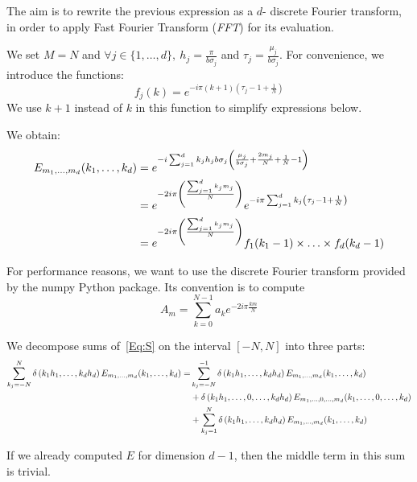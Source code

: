 The aim is to rewrite the previous expression as a $d$- discrete Fourier transform, in order to apply Fast Fourier Transform (\emph{FFT}) for its evaluation.

We set $M=N$ and $\forall j \in\{1,\hdots,d\},\: h_j=\frac{\pi}{b\sigma_j}$ and $\tau_j=\frac{\mu_j}{b\sigma_j}$.
For convenience, we introduce the functions:
$$
f_j(k) = e^{-i\pi (k+1)\left(\tau_j-1+\frac{1}{N}\right)}
$$
We use $k+1$ instead of $k$ in this function to simplify expressions below.

We obtain:
\begin{align}
E_{m_1,\hdots,m_d}(k_1,\hdots,k_d)&=e^{-i\sum_{j=1}^{d} k_jh_jb\sigma_j\left(\frac{\mu_j}{b\sigma_j}+\frac{2m_j}{N}+\frac{1}{N}-1\right)}\notag\\
   &=e^{-2i\pi\left(\frac{\sum_{j=1}^{d}k_j m_j}{N}\right)}e^{-i\pi\sum_{j=1}^{d} k_j\left(\tau_j-1+\frac{1}{N}\right)} \notag\\
   &=e^{-2i\pi\left(\frac{\sum_{j=1}^{d}k_j m_j}{N}\right)} f_1(k_1-1) \times\hdots\times f_d(k_d-1) \label{Eq:E}
\end{align}

For performance reasons, we want to use the discrete Fourier transform provided by the numpy Python package.  Its convention is to compute
$$
A_m = \sum_{k=0}^{N-1} a_k e^{-2i\pi\frac{km}{N}}
$$

We decompose sums of~\eqref{Eq:S} on the interval $[-N,N]$ into three parts:
\begin{align}
\sum_{k_j=-N}^{N}\delta\left(k_1h_1,\hdots,k_dh_d\right) E_{m_1,\hdots,m_d}(k_1,\hdots,k_d)
  = & \sum_{k_j=-N}^{-1} \delta\left(k_1h_1,\hdots,k_dh_d\right) E_{m_1,\hdots,m_d}(k_1,\hdots,k_d) \notag\\
  & + \delta\left(k_1h_1,\hdots,0,\hdots,k_dh_d\right) E_{m_1,\hdots,0,\hdots,m_d}(k_1,\hdots,0,\hdots,k_d) \notag\\
  & + \sum_{k_j=1}^{N}\delta\left(k_1h_1,\hdots,k_dh_d\right) E_{m_1,\hdots,m_d}(k_1,\hdots,k_d) \label{Eq:decomposition-sum}
\end{align}

If we already computed $E$ for dimension $d-1$, then the middle term in this sum is trivial.

